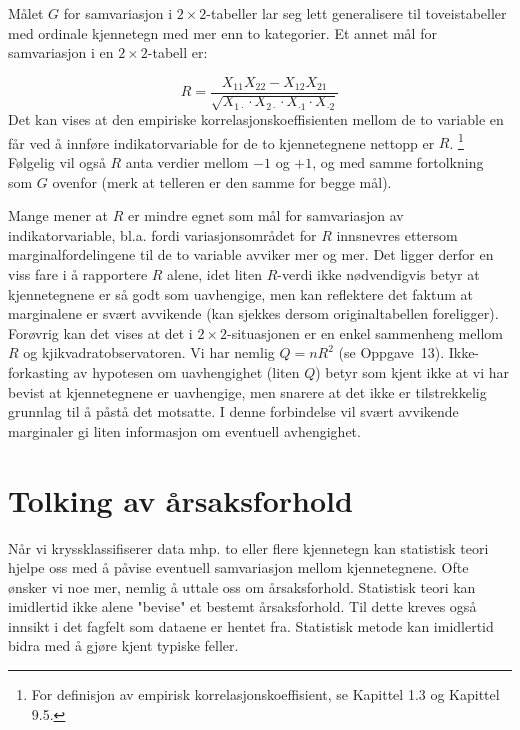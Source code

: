 Målet $G$ for samvariasjon i $2\times 2$-tabeller lar seg lett
generalisere til toveistabeller med ordinale kjennetegn med mer enn to
kategorier.  Et annet mål for samvariasjon i en $2\times 2$-tabell er:

\[ R=\frac{X_{11}X_{22}-X_{12}X_{21}}
     {\sqrt{X_{1\cdot}\cdot X_{2\cdot}\cdot X_{\cdot 1}\cdot X_{\cdot 2}}} \]
Det kan vises at den empiriske korrelasjonskoeffisienten mellom de to
variable en får ved å innføre indikatorvariable for de to
kjennetegnene nettopp er $R$. \footnote{For definisjon av empirisk
korrelasjonskoeffisient, se Kapittel 1.3 og Kapittel 9.5.}  Følgelig
vil også $R$ anta verdier mellom $-1$ og $+1$, og med samme
fortolkning som $G$ ovenfor (merk at telleren er den samme for begge mål).

Mange mener at $R$ er mindre egnet som mål for
samvariasjon av indikatorvariable, bl.a. fordi variasjonsområdet
for $R$ innsnevres ettersom marginalfordelingene til de to
variable avviker mer og mer.  Det ligger derfor en viss fare i å
rapportere $R$ alene, idet liten $R$-verdi ikke nødvendigvis betyr
at kjennetegnene er så godt som uavhengige, men kan reflektere det 
faktum at marginalene er svært avvikende (kan sjekkes dersom
originaltabellen foreligger).  Forøvrig kan det vises at det i
$2\times 2$-situasjonen er en enkel sammenheng mellom $R$ og
kjikvadratobservatoren.  Vi har nemlig $Q = nR^2$ (se Oppgave~13).
Ikke-forkasting av hypotesen om uavhengighet (liten $Q$) betyr som 
kjent ikke at vi har bevist at kjennetegnene er uavhengige, men snarere
at det ikke er tilstrekkelig grunnlag til å påstå det motsatte.
I denne forbindelse vil svært avvikende marginaler gi liten 
informasjon om eventuell avhengighet.



\section{Tolking av årsaksforhold}

Når vi kryssklassifiserer data mhp. to eller flere kjennetegn kan
statistisk teori hjelpe oss med å påvise eventuell samvariasjon
mellom kjennetegnene.  Ofte ønsker vi noe mer, nemlig å uttale
oss om årsaksforhold.  Statistisk teori kan imidlertid ikke alene
"bevise" et bestemt årsaksforhold.  Til dette kreves også
innsikt i det fagfelt som dataene er hentet fra.  Statistisk
metode kan imidlertid bidra med å gjøre kjent typiske feller.


